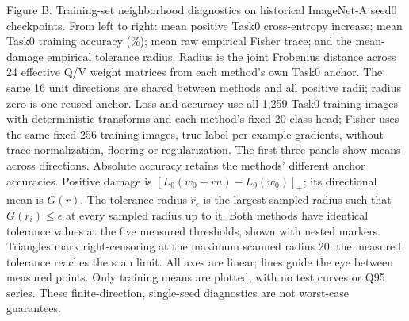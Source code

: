 \caption{Figure B. Training-set neighborhood diagnostics on historical ImageNet-A seed0 checkpoints. From left to right: mean positive Task0 cross-entropy increase; mean Task0 training accuracy (\%); mean raw empirical Fisher trace; and the mean-damage empirical tolerance radius. Radius is the joint Frobenius distance across 24 effective Q/V weight matrices from each method's own Task0 anchor. The same 16 unit directions are shared between methods and all positive radii; radius zero is one reused anchor. Loss and accuracy use all 1,259 Task0 training images with deterministic transforms and each method's fixed 20-class head; Fisher uses the same fixed 256 training images, true-label per-example gradients, without trace normalization, flooring or regularization. The first three panels show means across directions. Absolute accuracy retains the methods' different anchor accuracies. Positive damage is $[L_0(w_0+ru)-L_0(w_0)]_+$; its directional mean is $G(r)$. The tolerance radius $\hat r_\epsilon$ is the largest sampled radius such that $G(r_i)\leq\epsilon$ at every sampled radius up to it. Both methods have identical tolerance values at the five measured thresholds, shown with nested markers. Triangles mark right-censoring at the maximum scanned radius 20: the measured tolerance reaches the scan limit. All axes are linear; lines guide the eye between measured points. Only training means are plotted, with no test curves or Q95 series. These finite-direction, single-seed diagnostics are not worst-case guarantees.}
